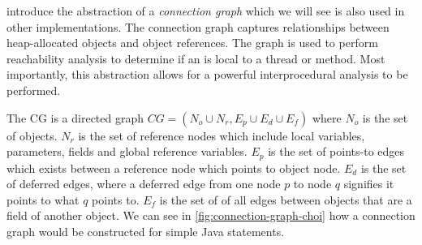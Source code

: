 \documentclass{proposal}
\begin{document}
    \citet{Choi1999} introduce the abstraction of a \emph{connection graph} which we will see is also used in other implementations.
    The connection graph captures relationships between heap-allocated objects and object references.
    The graph is used to perform reachability analysis to determine if an is local to a thread or method.
    Most importantly, this abstraction allows for a powerful interprocedural analysis to be performed.

    The CG is a directed graph $CG = (N_{o} \cup N_{r}, E_{p} \cup E_{d} \cup E_{f})$ where $N_{o}$ is the set of objects.
    $N_{r}$ is the set of reference nodes which include local variables, parameters, fields and global reference variables.
    $E_{p}$ is the set of points-to edges which exists between a reference node which points to object node.
    $E_{d}$ is the set of deferred edges, where a deferred edge from one node $p$ to node $q$ signifies it points to what $q$ points to.
    $E_{f}$ is the set of of all edges between objects that are a field of another object.
    We can see in \autoref{fig:connection-graph-choi} how a connection graph would be constructed for simple Java statements.
\end{document}

